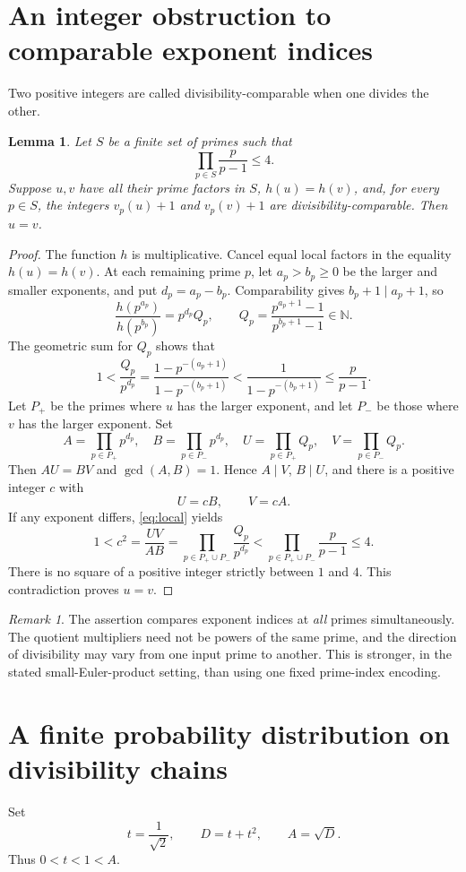 \documentclass[11pt,a4paper]{article}
\newtheorem{lemma}[theorem]{Lemma}
\theoremstyle{remark}\newtheorem*{remark}{Remark}
\newcommand{\NN}{\mathbb N}
\begin{document}
\section{An integer obstruction to comparable exponent indices}
Two positive integers are called divisibility-comparable when one divides the other.

\begin{lemma}\label{lem:incompatibility}
Let $S$ be a finite set of primes such that
\[
\prod_{p\in S}\frac{p}{p-1}\le4.
\]
Suppose $u,v$ have all their prime factors in $S$, $h(u)=h(v)$, and, for every $p\in S$, the integers $v_p(u)+1$ and $v_p(v)+1$ are divisibility-comparable. Then $u=v$.
\end{lemma}
\begin{proof}
The function $h$ is multiplicative. Cancel equal local factors in the equality $h(u)=h(v)$. At each remaining prime $p$, let $a_p>b_p\ge0$ be the larger and smaller exponents, and put $d_p=a_p-b_p$. Comparability gives $b_p+1\mid a_p+1$, so
\[
\frac{h(p^{a_p})}{h(p^{b_p})}=p^{d_p}Q_p,
\qquad Q_p=\frac{p^{a_p+1}-1}{p^{b_p+1}-1}\in\NN.
\]
The geometric sum for $Q_p$ shows that
\begin{equation}\label{eq:local}
1<\frac{Q_p}{p^{d_p}}
=\frac{1-p^{-(a_p+1)}}{1-p^{-(b_p+1)}}
<\frac1{1-p^{-(b_p+1)}}\le\frac{p}{p-1}.
\end{equation}
Let $P_+$ be the primes where $u$ has the larger exponent, and let $P_-$ be those where $v$ has the larger exponent. Set
\[
A=\prod_{p\in P_+}p^{d_p},\quad B=\prod_{p\in P_-}p^{d_p},
\quad U=\prod_{p\in P_+}Q_p,\quad V=\prod_{p\in P_-}Q_p.
\]
Then $AU=BV$ and $\gcd(A,B)=1$. Hence $A\mid V$, $B\mid U$, and there is a positive integer $c$ with
\[
U=cB,\qquad V=cA.
\]
If any exponent differs, \eqref{eq:local} yields
\[
1<c^2=\frac{UV}{AB}
=\prod_{p\in P_+\cup P_-}\frac{Q_p}{p^{d_p}}
<\prod_{p\in P_+\cup P_-}\frac{p}{p-1}\le4.
\]
There is no square of a positive integer strictly between $1$ and $4$. This contradiction proves $u=v$.
\end{proof}

\begin{remark}
The assertion compares exponent indices at \emph{all} primes simultaneously. The quotient multipliers need not be powers of the same prime, and the direction of divisibility may vary from one input prime to another. This is stronger, in the stated small-Euler-product setting, than using one fixed prime-index encoding.
\end{remark}

\section{A finite probability distribution on divisibility chains}
Set
\[
t=\frac1{\sqrt2},\qquad D=t+t^2,\qquad A=\sqrt D.
\]
Thus $0<t<1<A$.
\end{document}
